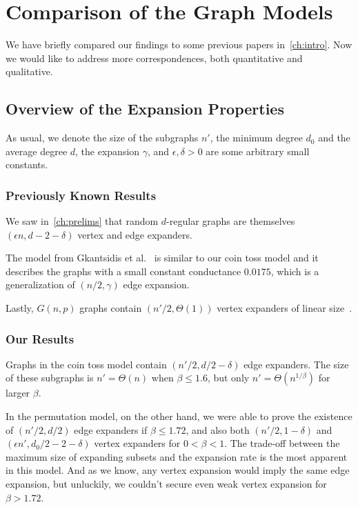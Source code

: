 \chapter{Comparison of the Graph Models}
\label{ch:comparison}

We have briefly compared our findings to some previous papers in~\autoref{ch:intro}.
Now we would like to address more correspondences, both quantitative and qualitative.

\section{Overview of the Expansion Properties}

As usual, we denote the size of the subgraphs $n'$,
the minimum degree $d_0$ and the average degree $d$,
the expansion $\gamma$, and $\epsilon,\delta>0$ are some arbitrary small constants.

\subsection{Previously Known Results}

We saw in~\autoref{ch:prelims} that random $d$-regular graphs are
themselves $(\epsilon n,d-2-\delta)$ vertex and edge expanders.

The model from Gkantsidis et al.~\cite{gms03} is similar to our coin toss model
and it describes the graphs with a small constant conductance $0.0175$,
which is a generalization of $(n/2,\gamma)$ edge expansion.

Lastly, $G(n,p)$ graphs contain $(n'/2,\Theta(1))$ vertex expanders of linear size~\cite{kri17}.

\subsection{Our Results}

Graphs in the coin toss model contain $(n'/2,d/2-\delta)$ edge expanders.
The size of these subgraphs is $n'=\Theta(n)$ when $\beta\leq 1.6$,
but only $n'=\Theta\left(n^{1/\beta}\right)$ for larger $\beta$.

In the permutation model, on the other hand, we were able to prove
the existence of $(n'/2,d/2)$ edge expanders if $\beta\leq 1.72$,
and also both $(n'/2,1-\delta)$ and $(\epsilon n',d_0/2-2-\delta)$
vertex expanders for $0<\beta<1$.
The trade-off between the maximum size of expanding subsets
and the expansion rate is the most apparent in this model.
And as we know, any vertex expansion would imply the same edge expansion,
but unluckily, we couldn't secure even weak vertex expansion for $\beta>1.72$.

